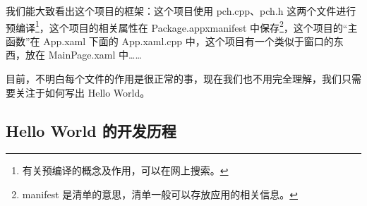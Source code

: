我们能大致看出这个项目的框架：这个项目使用 pch.cpp、pch.h 这两个文件进行预编译\footnote{有关预编译的概念及作用，可以在网上搜索。}，这个项目的相关属性在 Package.appxmanifest 中保存\footnote{manifest 是清单的意思，清单一般可以存放应用的相关信息。}，这个项目的``主函数''在 App.xaml 下面的 App.xaml.cpp 中，这个项目有一个类似于窗口的东西，放在 MainPage.xaml 中……

目前，不明白每个文件的作用是很正常的事，现在我们也不用完全理解，我们只需要关注于如何写出 Hello World。

\subsection{Hello World 的开发历程}